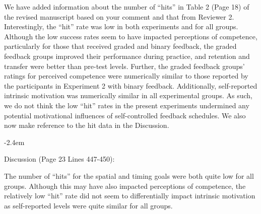 \documentclass[final]{article}
\renewenvironment{quote}{\begin{fquote}\advance\leftmargini -2.4em\begin{oldquote}}{\end{oldquote}\end{fquote}}
\newenvironment{fquote}
  {\def\FrameCommand{
	\fboxsep=0.6em %
	\fcolorbox{black}{white}}%
    \MakeFramed {\advance\hsize-2\width \FrameRestore}
    \begin{minipage}{\linewidth}
  }
  {\end{minipage}\endMakeFramed}
\newcommand{\TaskEstimationBox}[2]{%
\ifoptiondraft{\parbox{1.0\linewidth}{\hfill \hfill {\colorbox{#2}{\color{White} \textbf{#1}}}}}%
{}%
}
\def\Done {\TaskEstimationBox{Done}{Blue}}
\begin{document}
\Done


We have added information about the number of ``hits'' in Table 2 (Page 18) of the revised manuscript based on your comment and that from Reviewer 2. Interestingly, the ``hit'' rate was low in both experiments and for all groups. Although the low success rates seem to have impacted perceptions of competence, particularly for those that received graded and binary feedback, the graded feedback groups improved their performance during practice, and retention and transfer were better than pre-test levels. Further, the graded feedback groups' ratings for perceived competence were numerically similar to those reported by the participants in Experiment 2 with binary feedback. Additionally, self-reported intrinsic motivation was numerically similar in all experimental groups. As such, we do not think the low ``hit'' rates in the present experiments undermined any potential motivational influences of self-controlled feedback schedules. We also now make reference to the hit data in the Discussion.

\begin{quote}
Discussion (Page 23 Lines 447-450):

The number of ``hits'' for the spatial and timing goals were both quite low for all groups. Although this may have also impacted perceptions of competence, the relatively low ``hit'' rate did not seem to differentially impact intrinsic motivation as self-reported levels were quite similar for all groups.
\end{quote}

\Done

\end{document}
